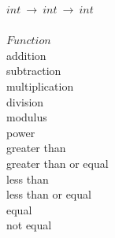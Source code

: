 \documentclass[5pt]{article}
\begin{document}
\begin{multicols}{3}
$int \ \rightarrow \ int \ \rightarrow \ int $ \\
\columnbreak \\
$Function$ \\
addition \\
subtraction \\
multiplication \\
division \\
modulus \\
power \\
greater than \\
greater than or equal \\
less than \\
less than or equal \\
equal \\
not equal \\
\end{multicols}
\end{document}
